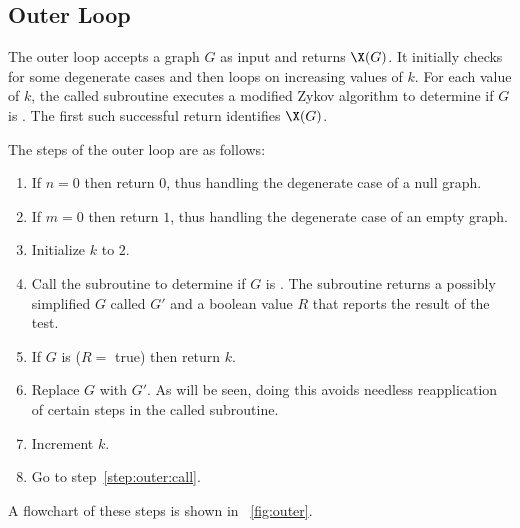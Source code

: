 \subsection{Outer Loop}\label{sec:sub:outer}

The outer loop accepts a graph \(G\) as input and returns \(\X(G)\).  It initially checks for some degenerate cases
and then loops on increasing values of \(k\).  For each value of \(k\), the called subroutine executes a modified
Zykov algorithm to determine if \(G\) is .  The first such successful return identifies \(\X(G)\).

The steps of the outer loop are as follows:

\begin{enumerate}
\item \label{step:outer:null} If \(n=0\) then return \(0\), thus handling the degenerate case of a null graph.

\item \label{step:outer:empty} If \(m=0\) then return \(1\), thus handling the degenerate case of an empty graph.

\item \label{step:outer:initk} Initialize \(k\) to \(2\).

\item \label{step:outer:call} Call the subroutine to determine if \(G\) is .  The subroutine returns a
  possibly simplified \(G\) called \(G'\) and a boolean value \(R\) that reports the result of the test.

\item \label{step:outer:result} If \(G\) is  (\(R=\) true) then return \(k\).

\item \label{step:outer:newg} Replace \(G\) with \(G'\).  As will be seen, doing this avoids needless reapplication of
  certain steps in the called subroutine.

\item \label{step:outer:incrk} Increment \(k\).

\item \label{step:outer:loop} Go to step~\ref{step:outer:call}.
\end{enumerate}

A flowchart of these steps is shown in \figurename~\ref{fig:outer}.

